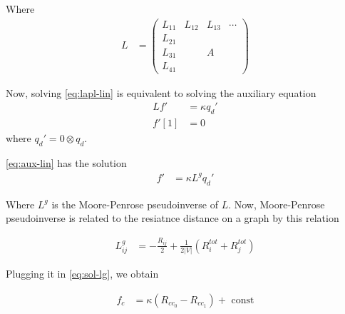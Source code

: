 \documentclass[10pt,aps,pra,twocolumn,superscriptaddress]{revtex4-1}
\begin{document}
Where 
\begin{align*}
L&=
\left(
\begin{array}{c|ccc}
L_{11} & L_{12} & L_{13} & \cdots \\
\hline
L_{21} &&&\\
L_{31} && A &\\
L_{41} &&&         
\end{array}
\right)
\end{align*}


Now, solving \eqref{eq:lapl-lin} is equivalent to solving the auxiliary equation
\begin{align}
\label{eq:aux-lin}
L f' &= \kappa q_d'\\
f'[1]&= 0
\end{align}
where $q_d'=0\otimes q_d$.  

\eqref{eq:aux-lin} has the solution
\begin{align}
\label{eq:sol-lg}
f'&=\kappa L^g q_d'
\end{align}

Where $L^g$ is the Moore-Penrose pseudoinverse of $L$.  Now, Moore-Penrose 
pseudoinverse is related to the resiatnce distance on a graph by this relation \cite{klein93}

\begin{align*}
L^g_{ij}&=-\frac{R_{ij}}{2}+\frac{1}{2|V|} \left( R_i^{tot}+R_j^{tot} \right)
\end{align*}

Plugging it in \eqref{eq:sol-lg}, we obtain

\begin{align*}
f_c&=\kappa \left(R_{cc_0}-R_{cc_1}\right) + \text{ const}
\end{align*}







\end{document}

